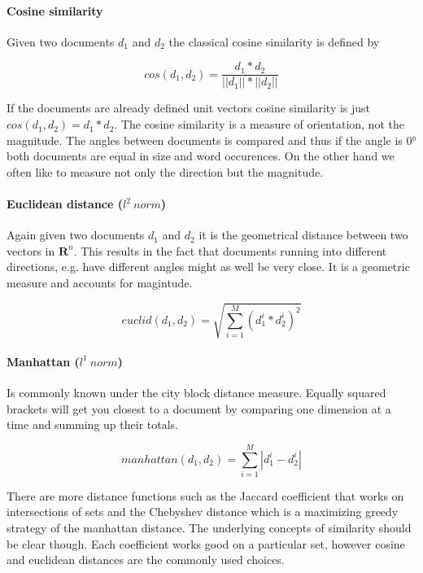     \paragraph{Cosine similarity}
    Given two documents $d_1$ and $d_2$ the classical cosine similarity is defined by

    \begin{equation}
      cos(d_1, d_2) = \frac{d_1 * d_2}{||d_1|| * ||d_2||}
    \end{equation}

    If the documents are already defined unit vectors cosine similarity is just $cos(d_1, d_2) = d_1 * d_2$. The cosine similarity is a measure of orientation, not the magnitude. The angles between documents is compared and thus if the angle is 0° both documents are equal in size and word occurences. On the other hand we often like to measure not only the direction but the magnitude.

    \paragraph{Euclidean distance ($l^2\:norm$)}
    Again given two documents $d_1$ and $d_2$ it is the geometrical distance between two vectors in $\mathbf{R}^n$. This results in the fact that documents running into different directions, e.g. have different angles might as well be very close. It is a geometric measure and accounts for magintude.

    \begin{equation}
      euclid(d_1, d_2) = \sqrt{\sum_{i=1}^{M}(d_1^i * d_2^i)^2}
    \end{equation}

    \paragraph{Manhattan ($l^1\:norm$)}
    Is commonly known under the city block distance measure. Equally squared brackets
    will get you closest to a document by comparing one dimension at a time and summing up their totals.

    \begin{equation}
      manhattan(d_1, d_2) = \sum_{i=1}^{M}|d_1^i - d_2^i|
    \end{equation}

    There are more distance functions such as the Jaccard coefficient that works on intersections of sets and the Chebyshev distance which is a maximizing greedy strategy of the manhattan distance. The underlying concepts of similarity should be clear though. Each coefficient works good on a particular set, however cosine and euclidean distances are the commonly used choices.

